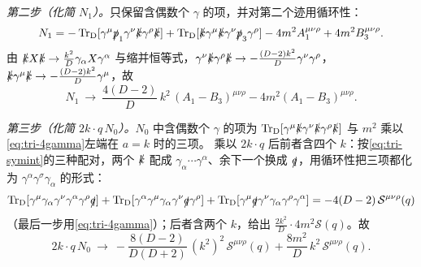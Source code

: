 \documentclass[UTF8,a4paper,11pt,fontset=fandol]{ctexart}
\makeatletter
\theoremstyle{cplain}
\theoremstyle{cdefinition}
\theoremstyle{cremark}
\renewcommand{\proofname}{证明}
\renewenvironment{proof}[1][\proofname]{\par\pushQED{\qed}\normalfont\topsep6\p@\@plus6\p@\relax
  \trivlist\item[\hskip\labelsep\itshape #1\hspace{0.5em}]\ignorespaces}{\popQED\endtrivlist\@endpefalse}
\numberwithin{equation}{section}
\newcommand{\TrD}{\operatorname{Tr}_{\mathrm{D}}}   %
\newcommand{\sla}[1]{\slashed{#1}}                  %
\makeatother
\begin{document}
\begin{proof}[{\cref{prop:triangle}(iv) 的证明}]
\emph{第二步（化简 $N_1$）。}只保留含偶数个 $\gamma$ 的项，并对第二个迹用循环性：
\begin{equation*}
N_1=-\TrD[\gamma^\mu\sla p_1\gamma^\nu\sla k\gamma^\rho\sla k]+\TrD[\sla k\gamma^\mu\sla k\gamma^\nu\sla p_3\gamma^\rho]-4m^2A_1^{\mu\nu\rho}+4m^2B_3^{\mu\nu\rho}.
\end{equation*}
由 $\sla kX\sla k\to\frac{k^2}{D}\gamma_\alpha X\gamma^\alpha$ 与缩并恒等式，$\gamma^\nu\sla k\gamma^\rho\sla k\to-\frac{(D-2)k^2}{D}\gamma^\nu\gamma^\rho$，$\sla k\gamma^\mu\sla k\to-\frac{(D-2)k^2}{D}\gamma^\mu$，故
\begin{equation}\label{eq:tri-N1}
N_1\ \to\ \frac{4(D-2)}{D}\,k^2\,(A_1-B_3)^{\mu\nu\rho}-4m^2(A_1-B_3)^{\mu\nu\rho}.
\end{equation}

\emph{第三步（化简 $2k\cdot q\,N_0$）。}$N_0$ 中含偶数个 $\gamma$ 的项为 $\TrD[\gamma^\mu\sla k\gamma^\nu\sla k\gamma^\rho\sla k]$ 与 $m^2$ 乘以\cref{eq:tri-4gamma}左端在 $a=k$ 时的三项。
乘以 $2k\cdot q$ 后前者含四个 $k$：按\cref{eq:tri-symint}的三种配对，两个 $\sla k$ 配成 $\gamma_\alpha\cdots\gamma^\alpha$、余下一个换成 $\sla q$，用循环性把三项都化为 $\gamma^\alpha\gamma^\sigma\gamma_\alpha$ 的形式：
\begin{equation*}
\TrD[\gamma^\mu\gamma_\alpha\gamma^\nu\gamma^\alpha\gamma^\rho\sla q]+\TrD[\gamma^\alpha\gamma^\mu\gamma_\alpha\gamma^\nu\sla q\gamma^\rho]+\TrD[\gamma^\mu\sla q\gamma^\nu\gamma_\alpha\gamma^\rho\gamma^\alpha]
=-4(D-2)\,\mathcal S^{\mu\nu\rho}(q)
\end{equation*}
（最后一步用\cref{eq:tri-4gamma}）；后者含两个 $k$，给出 $\frac{2k^2}{D}\cdot4m^2\mathcal S(q)$。故
\begin{equation}\label{eq:tri-N0}
2k\cdot q\,N_0\ \to\ -\frac{8(D-2)}{D(D+2)}\,(k^2)^2\,\mathcal S^{\mu\nu\rho}(q)+\frac{8m^2}{D}\,k^2\,\mathcal S^{\mu\nu\rho}(q).
\end{equation}


\end{proof}
\end{document}
